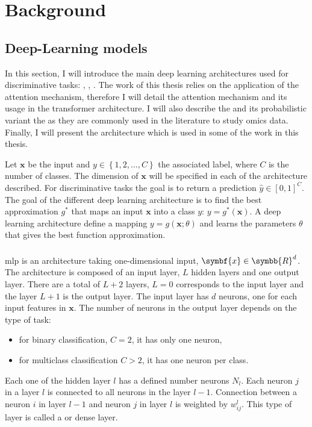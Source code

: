 \documentclass[../main.tex]{subfiles}
\begin{document}
\chapter{Background}\label{chap:background}
\minitocpage

\section{Deep-Learning models}
 In this section, I will introduce the main deep learning architectures used for discriminative tasks: , , .
 The work of this thesis relies on the application of the attention mechanism, therefore I will detail the attention mechanism and its usage in the transformer architecture.
 I will also describe the  and its probabilistic variant the  as they are commonly used in the literature to study omics data.
 Finally, I will present the  architecture which is used in some of the work in this thesis.

 Let \(\symbf{x}\) be the input and \(y \in \left\{1,2, \ldots, C \right\} \) the associated label, where \(C\) is the number of classes.
 The dimension of \(\symbf{x}\) will be specified in each of the architecture described.
 For discriminative tasks the goal is to return a prediction \(\hat{y} \in {\left[0,1\right]}^C\).
 The goal of the different deep learning architecture is to find the best approximation \(g^{*}\) that maps an input \(\symbf{x}\) into a class \(y\): \(y = g^{*}\left(\symbf{x}\right)\).
 A deep learning architecture define a mapping \(y=g\left(\symbf{x}; \theta\right)\) and learns the parameters \(\theta\) that gives the best function approximation.


 \subsection{}\label{subsec:mlp}
     \Gls{mlp} is an architecture taking one-dimensional input, \(\symbf{x} \in \symbb{R}^d\).
     The architecture is composed of an input layer, \(L\) hidden layers and one output layer.
     There are a total of \(L+2\) layers, \(L=0\) corresponds to the input layer and the layer \(L+1\) is the output layer.
     The input layer has \(d\) neurons, one for each input features in \(\symbf{x}\).
     The number of neurons in the output layer depends on the type of task:
     \begin{itemize}
         \item for binary classification, \(C=2\), it has only one neuron,
         \item for multiclass classification \(C > 2 \), it has one neuron per class.
     \end{itemize}
     Each one of the hidden layer \(l\) has a defined number neurons \(N_{l}\).
     Each neuron \(j\) in a layer \(l\) is connected to all neurons in the layer \(l-1\).
     Connection between a neuron \(i\) in layer \(l-1\) and neuron \(j\) in layer \(l\) is weighted by \(w^{l}_{ij}\).
     This type of layer is called a  or dense layer.
\end{document}
